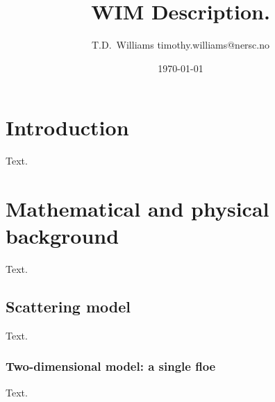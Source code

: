 \documentclass[12pt,a4paper]{report}
\begin{document}
\title{WIM Description.}


\author{T.D.~Williams\authorcr
timothy.williams@nersc.no}

\date{\today}
\maketitle

\tableofcontents
\chapter{Introduction}

Text.

\chapter{Mathematical and physical background}

Text.


\section{Scattering model}
Text.

\subsection{Two-dimensional model: a single floe}

Text.
\cite{williams-etal2013-break2}

\end{document}
